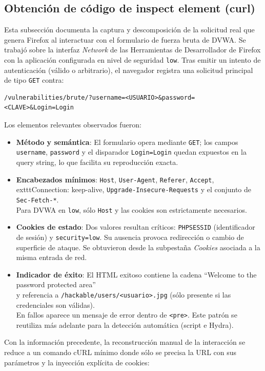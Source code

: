 \documentclass[letterpaper,12pt]{article}
\let\origsubsection\subsection
\renewcommand{\subsection}{\FloatBarrier\origsubsection}
\begin{document}
\subsection{Obtención de código de inspect element (curl)}
Esta subsección documenta la captura y descomposición de la solicitud real que genera Firefox al interactuar con el formulario de fuerza bruta de DVWA. Se trabajó sobre la interfaz \emph{Network} de las Herramientas de Desarrollador de Firefox con la aplicación configurada en nivel de seguridad \texttt{low}. Tras emitir un intento de autenticación (válido o arbitrario), el navegador registra una solicitud principal de tipo \texttt{GET} contra:
\begin{verbatim}
/vulnerabilities/brute/?username=<USUARIO>&password=<CLAVE>&Login=Login
\end{verbatim}
Los elementos relevantes observados fueron:
\begin{itemize}
        \item \textbf{Método y semántica}: El formulario opera mediante \texttt{GET}; los campos \texttt{username}, \texttt{password} y el disparador \texttt{Login=Login} quedan expuestos en la query string, lo que facilita su reproducción exacta.
    \item \textbf{Encabezados mínimos}: \texttt{Host}, \texttt{User-Agent}, \texttt{Referer}, \texttt{Accept}, \\
    	exttt{Connection: keep-alive}, \texttt{Upgrade-Insecure-Requests} y el conjunto de \texttt{Sec-Fetch-*}. \\
    Para DVWA en \texttt{low}, sólo \texttt{Host} y las cookies son estrictamente necesarios.
        \item \textbf{Cookies de estado}: Dos valores resultan críticos: \texttt{PHPSESSID} (identificador de sesión) y \texttt{security=low}. Su ausencia provoca redirección o cambio de superficie de ataque. Se obtuvieron desde la subpestaña \emph{Cookies} asociada a la misma entrada de red.
    \item \textbf{Indicador de éxito}: El HTML exitoso contiene la cadena ``Welcome to the password protected area'' \\
    y referencia a \texttt{/hackable/users/\allowbreak<usuario>.jpg} (sólo presente si las credenciales son válidas). \\
    En fallos aparece un mensaje de error dentro de \texttt{<pre>}. Este patrón se reutiliza más adelante para la detección automática (script e Hydra).
\end{itemize}
Con la información precedente, la reconstrucción manual de la interacción se reduce a un comando cURL mínimo donde sólo se precisa la URL con sus parámetros y la inyección explícita de cookies:
\end{document}
